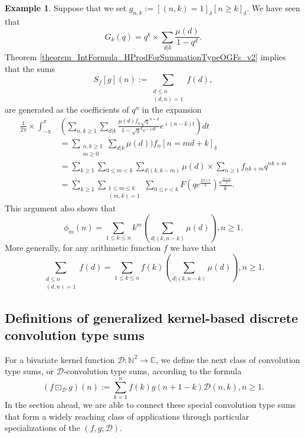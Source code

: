 \documentclass[12pt,reqno,a4letter]{article}
\numberwithin{figure}{section}
\numberwithin{table}{section}
\numberwithin{equation}{section}
\newcommand{\Iverson}[1]{\ensuremath{\left[#1\right]_{\delta}}}
\theoremstyle{plain}
\numberwithin{theorem}{section}
\theoremstyle{definition}
\newtheorem{example}[theorem]{Example}
\begin{document}
\begin{example} 
Suppose that we set $g_{n,k} := \Iverson{(n,k)=1} \Iverson{n \geq k}$. 
We have seen that 
\[
G_k(q) = q^k \times \sum_{d|k} \frac{\mu(d)}{1-q^{d}}. 
\]
Theorem \ref{theorem_IntFormula_HProdForSummationTypeOGFs_v2} implies that the sums 
\[
S_f[g](n) := \sum_{\substack{d \leq n \\ (d,n)=1}} f(d), 
\]
are generated as the coefficients of $q^n$ in the expansion 
\cite[\S 1]{TAOCPV1} 
\begin{align*}
\frac{1}{2\pi} \times \int_{-\pi}^{\pi} & \left(\sum_{n,k \geq 1} \sum_{d|k} 
     \frac{\mu(d) f_n \sqrt{q}^{n+k}}{1-\sqrt{q}^d e^{-\imath dt}} e^{\imath (n-k) t}\right) dt \\ 
     & = 
     \sum_{\substack{n,k \geq 1 \\ m \geq 0}} \sum_{d|k} \mu(d)) f_n \Iverson{n=md+k} \\ 
     & = \sum_{k \geq 1} \sum_{0 \leq m < k} \sum_{d|(k,k-m)} \mu(d) \times \sum_{n \geq 1} 
     f_{nk+m} q^{nk+m} \\ 
     & = 
     \sum_{k \geq 1} \sum_{\substack{1 \leq m \leq k \\ (m, k)=1}} \sum_{0 \leq r < k} 
     F\left(q e^{\frac{2\pi\imath r}{k}}\right) \frac{e^{\frac{2\pi\imath m}{k}}}{k}. 
\end{align*} 
This argument also shows that 
\[
\phi_m(n) = \sum_{1 \leq k \leq n} k^m\left(\sum_{d|(k,n-k)} \mu(d)\right), n \geq 1. 
\]
More generally, for any arithmetic function $f$ we have that 
\[
\sum_{\substack{d \leq n \\ (d,n)=1}} f(d) = \sum_{1 \leq k \leq n} f(k)\left(\sum_{d|(k,n-k)} \mu(d)\right), n \geq 1. 
\]
\end{example}

\subsection{Definitions of generalized kernel-based discrete convolution type sums} 
\label{subSection_DCvls_v1}

For a bivariate kernel function 
$\mathcal{D}: \mathbb{N}^2 \rightarrow \mathbb{C}$, 
we define the next class of convolution type sums, or $\mathcal{D}$-convolution type sums, 
according to the formula 
\begin{equation}
\label{eqn_DCvlSummationBasedExpDefs_restated_v2} 
(f \boxdot_{\mathcal{D}} g)(n) := \sum_{k=1}^{n} f(k) g(n+1-k) \mathcal{D}(n, k), n \geq 1. 
\end{equation} 
In the section ahead, we are able to connect these 
special convolution type sums that form a widely reaching class of applications through 
particular specializations of the $(f, g; \mathcal{D})$. 
\end{document}
